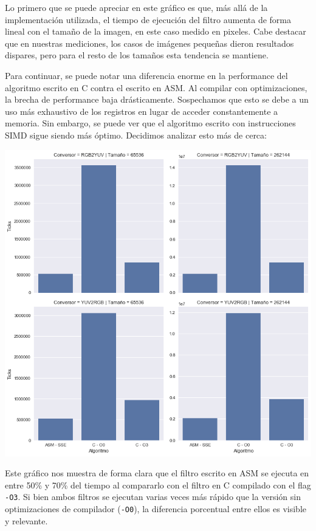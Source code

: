 Lo primero que se puede apreciar en este gráfico es que, más allá de la implementación utilizada, el tiempo de ejecución del filtro aumenta de forma lineal con el tamaño de la imagen, en este caso medido en pixeles. Cabe destacar que en nuestras mediciones, los casos de imágenes pequeñas dieron resultados dispares, pero para el resto de los tamaños esta tendencia se mantiene.

Para continuar, se puede notar una diferencia enorme en la performance del algoritmo escrito en C contra el escrito en ASM. Al compilar con optimizaciones, la brecha de performance baja drásticamente. Sospechamos que esto se debe a un uso más exhaustivo de los registros en lugar de acceder constantemente a memoria. Sin embargo, se puede ver que el algoritmo escrito con instrucciones SIMD sigue siendo más óptimo. Decidimos analizar esto más de cerca:

\begin{center}
	\includegraphics[scale=0.5]{img/conversores_CvsASMvsO3_bars.png}
\end{center}

Este gráfico nos muestra de forma clara que el filtro escrito en ASM se ejecuta en entre 50\% y 70\% del tiempo al compararlo con el filtro en C compilado con el flag \texttt{-O3}. Si bien ambos filtros se ejecutan varias veces más rápido que la versión sin optimizaciones de compilador (\texttt{-O0}), la diferencia porcentual entre ellos es visible y relevante.

